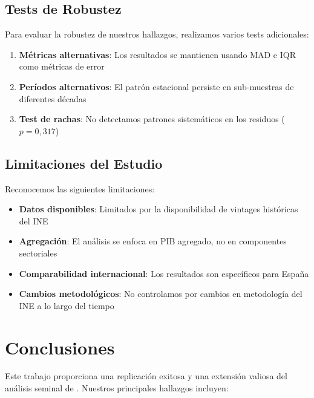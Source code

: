 \documentclass{article}
\begin{document}
\subsection{Tests de Robustez}

Para evaluar la robustez de nuestros hallazgos, realizamos varios tests adicionales:

\begin{enumerate}
\item \textbf{Métricas alternativas}: Los resultados se mantienen usando MAD e IQR como métricas de error
\item \textbf{Períodos alternativos}: El patrón estacional persiste en sub-muestras de diferentes décadas  
\item \textbf{Test de rachas}: No detectamos patrones sistemáticos en los residuos ($p = 0,317$)
\end{enumerate}

\subsection{Limitaciones del Estudio}

Reconocemos las siguientes limitaciones:

\begin{itemize}
\item \textbf{Datos disponibles}: Limitados por la disponibilidad de vintages históricas del INE
\item \textbf{Agregación}: El análisis se enfoca en PIB agregado, no en componentes sectoriales
\item \textbf{Comparabilidad internacional}: Los resultados son específicos para España
\item \textbf{Cambios metodológicos}: No controlamos por cambios en metodología del INE a lo largo del tiempo
\end{itemize}

\section{Conclusiones}

Este trabajo proporciona una replicación exitosa y una extensión valiosa del análisis seminal de \citet{pavia2017}. Nuestros principales hallazgos incluyen:
\end{document}
